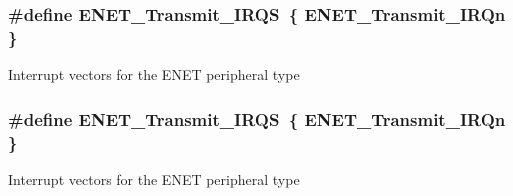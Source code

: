 \subsubsection[{\texorpdfstring{E\+N\+E\+T\+\_\+\+Transmit\+\_\+\+I\+R\+QS}{ENET_Transmit_IRQS}}]{\setlength{\rightskip}{0pt plus 5cm}\#define E\+N\+E\+T\+\_\+\+Transmit\+\_\+\+I\+R\+QS~\{ {\bf E\+N\+E\+T\+\_\+\+Transmit\+\_\+\+I\+R\+Qn} \}}\hypertarget{group__ENET__Peripheral__Access__Layer_ga42cb25446e48980b81b282094208c238}{}\label{group__ENET__Peripheral__Access__Layer_ga42cb25446e48980b81b282094208c238}
Interrupt vectors for the E\+N\+ET peripheral type 
\subsubsection[{\texorpdfstring{E\+N\+E\+T\+\_\+\+Transmit\+\_\+\+I\+R\+QS}{ENET_Transmit_IRQS}}]{\setlength{\rightskip}{0pt plus 5cm}\#define E\+N\+E\+T\+\_\+\+Transmit\+\_\+\+I\+R\+QS~\{ {\bf E\+N\+E\+T\+\_\+\+Transmit\+\_\+\+I\+R\+Qn} \}}\hypertarget{group__ENET__Peripheral__Access__Layer_ga42cb25446e48980b81b282094208c238}{}\label{group__ENET__Peripheral__Access__Layer_ga42cb25446e48980b81b282094208c238}
Interrupt vectors for the E\+N\+ET peripheral type 